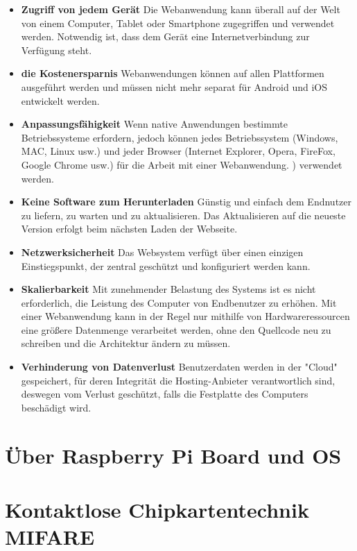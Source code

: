 \begin{itemize}
	\item \textbf{Zugriff von jedem Gerät} Die Webanwendung kann überall auf der Welt von einem Computer, Tablet oder Smartphone zugegriffen und verwendet werden. Notwendig ist, dass dem Gerät eine Internetverbindung zur Verfügung steht.

\item \textbf{die Kostenersparnis} Webanwendungen können auf allen Plattformen ausgeführt werden und müssen nicht mehr separat für Android und iOS entwickelt werden.

\item \textbf{Anpassungsfähigkeit} Wenn native Anwendungen bestimmte Betriebssysteme erfordern, jedoch können jedes Betriebssystem (Windows, MAC, Linux usw.) und jeder Browser (Internet Explorer, Opera, FireFox, Google Chrome usw.) für die Arbeit mit einer Webanwendung. ) verwendet werden.

\item \textbf{Keine Software zum Herunterladen} Günstig und einfach dem Endnutzer zu liefern, zu warten und zu aktualisieren. Das Aktualisieren auf die neueste Version erfolgt beim nächsten Laden der Webseite.

\item \textbf{Netzwerksicherheit} Das Websystem verfügt über einen einzigen Einstiegspunkt, der zentral geschützt und konfiguriert werden kann.

\item \textbf{Skalierbarkeit} Mit zunehmender Belastung des Systems ist es nicht erforderlich, die Leistung des Computer von Endbenutzer zu erhöhen. Mit einer Webanwendung kann in der Regel nur mithilfe von Hardwareressourcen eine größere Datenmenge verarbeitet werden, ohne den Quellcode neu zu schreiben und die Architektur ändern zu müssen.

\item \textbf{Verhinderung von Datenverlust} Benutzerdaten werden in der "Cloud" gespeichert, für deren Integrität die Hosting-Anbieter verantwortlich sind, deswegen vom Verlust geschützt, falls die Festplatte des Computers beschädigt wird.
\end{itemize}

\section{Über Raspberry Pi Board und OS}
\label{sec:theorie:raspberry}

\section{Kontaktlose Chipkartentechnik MIFARE}
\label{sec:theorie:mifare}

